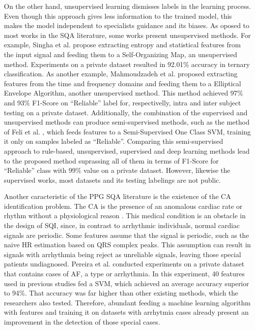 On the other hand, unsupervised learning dismisses labels in the learning process. Even though this approach gives less information to the trained model, this makes the model independent to specialists guidance and its biases. As oposed to most works in the \gls{SQA} literature, some works present unsupervised methods. For example, Singha et al. \cite{ppg-sqa-4} propose extracting entropy and statistical features from the input signal and feeding them to a Self-Organizing Map, an unsupervised method. Experiments on a private dataset resulted in 92.01\% accuracy in ternary classification. As another example, Mahmoudzadeh et al. \cite{ppg-sqa-5} proposed extracting features from the time and frequency domains and feeding them to a Elliptical Envelope Algorithm, another unsupervised method. This method achieved 97\% and 93\% F1-Score on ``Reliable'' label for, respectivelly, intra and inter subject testing on a private dataset. Additionally, the combination of the supervised and unsupervised methods can produce semi-supervised methods, such as the method of Feli et al. \cite{ppg-sqa-6}, which feeds features to a Semi-Supervised One Class \gls{SVM}, training it only on samples labeled as ``Reliable''. Comparing this semi-supervised approach to rule-based, unsupervised, supervised and deep learning methods lead to the proposed method suprassing all of them in terms of F1-Score for ``Reliable'' class with 99\% value on a private dataset. However, likewise the supervised works, most datasets and its testing labelings are not public.		

Another caracteristic of the \gls{PPG} \gls{SQA} literature is the existence of the \gls{CA} identification problem. The \gls{CA} is the presence of an anomalous cardiac rate or rhythm without a physiological reason \cite{arrhythmia-1}. This medical condition is an obstacle in the design of \gls{SQI}, since, in contrast to arrhythmic individuals, normal cardiac signals are periodic. Some features assume that the signal is periodic, such as the naive \gls{HR} estimation based on QRS complex peaks. This assumption can result in signals with arrhythmia being reject as unreliable signals, leaving those special patients undiagnosed. Pereira et al. \cite{arrhythmia-2} conducted experiments on a private dataset that contains cases of \gls{AF}, a type or arrhythmia. In this experiment, 40 features used in previous studies fed a \gls{SVM}, which achieved an average accuracy superior to 94\%. That accuracy was far higher than other existing methods, which the researchers also tested. Therefore, abundant feeding a machine learning algorithm with features and training it on datasets with arrhytmia cases already present an improvement in the detection of those special cases.

